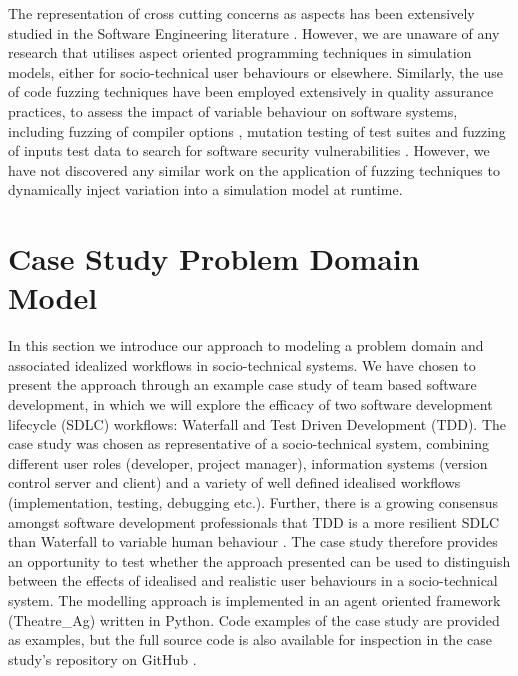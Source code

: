\documentclass{llncs}
\begin{document}
The representation of cross cutting concerns as aspects has been extensively studied in the Software Engineering
literature \citep{Ali2012Aspect}.  However, we are unaware of any research that utilises aspect oriented programming
techniques in simulation models, either for socio-technical user behaviours or elsewhere.  Similarly, the use of code
fuzzing techniques have been employed extensively in quality assurance practices, to assess the impact of variable
behaviour on software systems, including fuzzing of compiler options \cite{fuzzing-compiler}, mutation testing of test
suites \cite{demillo78hints} and fuzzing of inputs test data to search for software security vulnerabilities
\citep{takanen08fuzzing}.  However, we have not discovered any similar work on the application of fuzzing techniques to
dynamically inject variation into a simulation model at runtime.


\section{Case Study Problem Domain Model}
\label{sec:case-study}


In this section we introduce our approach to modeling a problem domain and associated idealized workflows in
socio-technical systems.  We have chosen to present the approach through an example case study of team based software
development, in which we will explore the efficacy of two software development lifecycle (SDLC) workflows: Waterfall and
Test Driven Development (TDD).  The case study was chosen as representative of a socio-technical system, combining
different user roles (developer, project manager), information systems (version control server and client) and a variety
of well defined idealised workflows (implementation, testing, debugging etc.).  Further, there is a growing consensus
amongst software development professionals that TDD is a more resilient SDLC than Waterfall to variable human behaviour
\citep{Bhat2006TestDrivenDevelopment,George2004TestDrivenDevelopment,Huang2009EmpiricalTestFirstProgramming}.  The case
study therefore provides an opportunity to test whether the approach presented can be used to distinguish between the
effects of idealised and realistic user behaviours in a socio-technical system.  The modelling approach is implemented
in an agent oriented framework (Theatre\_Ag) written in Python.  Code examples of the case study are provided as
examples, but the full source code is also available for inspection in the case study's repository on GitHub
\cite{storer2016softdev-workflow-scm}.
\end{document}
